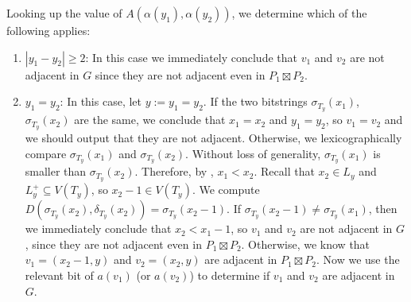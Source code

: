 \documentclass[10pt, conference, compsocconf]{IEEEtran}
\let\ge\geqslant
\begin{document}
Looking up the value of $A(\alpha(y_1),\alpha(y_2))$, we determine which of the following applies:
\begin{enumerate}
  \item $|y_1-y_2|\ge 2$: In this case we immediately conclude that $v_1$ and $v_2$ are not adjacent in $G$ since they are not adjacent even in $P_1\boxtimes P_2$. %

  \item $y_1=y_2$: In this case, let $y:=y_1=y_2$.
  If the two bitstrings $\sigma_{T_y}(x_1)$, $\sigma_{T_y}(x_2)$ are the same,
  we conclude that $x_1=x_2$ and $y_1=y_2$, so $v_1=v_2$ and we should output that they are not adjacent.
  Otherwise, we
  lexicographically compare $\sigma_{T_y}(x_1)$ and $\sigma_{T_y}(x_2)$.
  Without loss of generality, $\sigma_{T_y}(x_1)$ is smaller than $\sigma_{T_y}(x_2)$.
  Therefore, by , $x_1<x_2$.
  Recall that $x_2 \in L_y$ and $L^+_y\subseteq V(T_y)$, so $x_2-1 \in V(T_y)$.
  We compute $D(\sigma_{T_y}(x_2),\delta_{T_y}(x_2))=\sigma_{T_y}(x_2-1)$. If $\sigma_{T_y}(x_2-1)\neq \sigma_{T_y}(x_1)$, then we immediately conclude that $x_2 < x_1-1$, so $v_1$ and $v_2$ are not adjacent in $G$, since they are not adjacent even in $P_1\boxtimes P_2$.  Otherwise, we know that
  $v_1=(x_2-1,y)$ and $v_2=(x_2,y)$ are adjacent in $P_1\boxtimes P_2$.
  Now we use the relevant bit of $a(v_1)$ (or $a(v_2)$) to determine if $v_1$ and $v_2$ are adjacent in $G$.


\end{enumerate}
\end{document}
